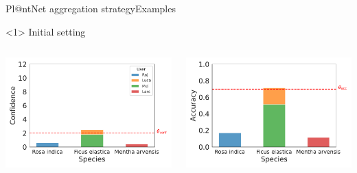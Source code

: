 \begin{frame}{Pl@ntNet aggregation strategy}{Examples}
    \begin{onlyenv}<1>
        Initial setting
        \begin{columns}
            \begin{column}{.5\textwidth}
                \begin{center}
                    \includegraphics[width=\textwidth]{./images/histplot_conf_init.pdf}
                \end{center}
            \end{column}
            \begin{column}{.5\textwidth}
                \begin{center}
                    \includegraphics[width=\textwidth]{./images/histplot_acc_init.pdf}

\end{center}
\end{column}
\end{columns}
\end{onlyenv}
\end{frame}
